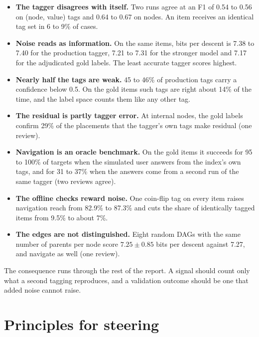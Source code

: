 \documentclass[10pt,a4paper]{article}
\begin{document}
\begin{itemize}
\item \textbf{The tagger disagrees with itself.} Two runs agree at an F1 of 0.54 to 0.56 on (node, value) tags and 0.64 to 0.67 on nodes. An item receives an identical tag set in 6 to 9\% of cases.
\item \textbf{Noise reads as information.} On the same items, bits per descent is 7.38 to 7.40 for the production tagger, 7.21 to 7.31 for the stronger model and 7.17 for the adjudicated gold labels. The least accurate tagger scores highest.
\item \textbf{Nearly half the tags are weak.} 45 to 46\% of production tags carry a confidence below 0.5. On the gold items such tags are right about 14\% of the time, and the label space counts them like any other tag.
\item \textbf{The residual is partly tagger error.} At internal nodes, the gold labels confirm 29\% of the placements that the tagger's own tags make residual (one review).
\item \textbf{Navigation is an oracle benchmark.} On the gold items it succeeds for 95 to 100\% of targets when the simulated user answers from the index's own tags, and for 31 to 37\% when the answers come from a second run of the same tagger (two reviews agree).
\item \textbf{The offline checks reward noise.} One coin-flip tag on every item raises navigation reach from 82.9\% to 87.3\% and cuts the share of identically tagged items from 9.5\% to about 7\%.
\item \textbf{The edges are not distinguished.} Eight random DAGs with the same number of parents per node score $7.25 \pm 0.85$ bits per descent against 7.27, and navigate as well (one review).
\end{itemize}

The consequence runs through the rest of the report. A signal should count only what a second tagging
reproduces, and a validation outcome should be one that added noise cannot raise.

\section{Principles for steering}
\end{document}
